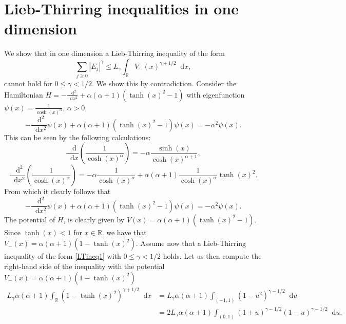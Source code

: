 \documentclass[a4paper,11pt]{article}
\newcommand{\abs}[1]{\left\lvert #1 \right\rvert}
\newcommand*\diff{\mathop{}\!\mathrm{d}}
\newcommand{\R}{\mathbb{R}}
\numberwithin{equation}{section}
\begin{document}
\section{Lieb-Thirring inequalities in one dimension}
We show that in one dimension a Lieb-Thirring inequality of the form \begin{equation}
\sum_{j\geq0}\abs{E_j}^\gamma\leq L_\gamma\int_{\R}V_{-}(x)^{\gamma+1/2}\diff x, \label{LTineq1}
\end{equation}
cannot hold for $ 0\leq\gamma < 1/2 $. We show this by contradiction. Consider the Hamiltonian $ H=-\frac{\diff^2}{\diff x^2}+\alpha(\alpha+1)(\tanh(x)^2-1) $ with eigenfunction $ \psi(x)=\frac{1}{\cosh(x)^\alpha}$, $ \alpha>0 $,
\begin{equation}
-\frac{\diff^2}{\diff x^2}\psi(x)+\alpha(\alpha+1)(\tanh(x)^2-1)\psi(x)=-\alpha^2\psi(x).
\end{equation}
This can be seen by the following calculations:
\begin{equation}
\frac{\diff}{\diff x}\left(\frac{1}{\cosh(x)^\alpha}\right)=-\alpha\frac{\sinh(x)}{\cosh(x)^{\alpha+1}},
\end{equation}
\begin{equation}
\frac{\diff^2}{\diff x^2}\left(\frac{1}{\cosh(x)^\alpha}\right)=-\alpha\frac{1}{\cosh(x)^\alpha}+\alpha(\alpha+1)\frac{1}{\cosh(x)^\alpha}\tanh(x)^2.
\end{equation}
From which it clearly follows that\begin{equation}
-\frac{\diff^2}{\diff x^2}\psi(x)+\alpha(\alpha+1)(\tanh(x)^2-1)\psi(x)=-\alpha^2\psi(x).
\end{equation}
The potential of $ H $, is clearly given by $ V(x)=\alpha(\alpha+1)(\tanh(x)^2-1) $. Since $ \tanh(x)<1 $ for $ x\in\R $. we have that $ V_-(x)=\alpha(\alpha+1)(1-\tanh(x)^2) $. Assume now that a Lieb-Thirring inequality of the form \eqref{LTineq1} with $ 0\leq\gamma<1/2 $ holds. Let us then compute the right-hand side of the inequality with the potential $ V_-(x)=\alpha(\alpha+1)(1-\tanh(x)^2) $\begin{equation}
\begin{aligned}
L_\gamma\alpha(\alpha+1)\int_{\R}(1-\tanh(x)^2)^{\gamma+1/2} \diff x&=L_\gamma\alpha(\alpha+1)\int_{(-1,1)}(1-u^2)^{\gamma-1/2} \diff u\\
&=2L_\gamma\alpha(\alpha+1)\int_{(0,1)}(1+u)^{\gamma-1/2}(1-u)^{\gamma-1/2} \diff u,\label{int1}
\end{aligned}
\end{equation}
\end{document}
